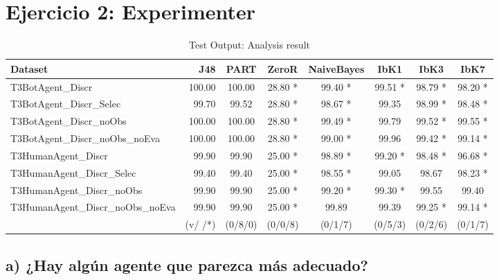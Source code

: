 \documentclass[10pt, spanish, pdftex]{../.memo/plantilla_memorias}
\begin{document}
\section{Ejercicio 2: Experimenter}
\begin{table}[h]
	\centering
	\begin{tabular}{l|r|cccccc|}
	\hline
	\multicolumn{1}{|l|}{Dataset}                           & J48     & PART    & ZeroR   & NaiveBayes & IbK1    & IbK3    & IbK7    \\ \hline
	\multicolumn{1}{|l|}{T3BotAgent\_Discr}                 & 100.00  & 100.00  & 28.80 * & 99.40 *    & 99.51 * & 98.79 * & 98.20 * \\
	\multicolumn{1}{|l|}{T3BotAgent\_Discr\_Selec}          & 99.70   & 99.52   & 28.80 * & 98.67 *    & 99.35   & 98.99 * & 98.48 * \\
	\multicolumn{1}{|l|}{T3BotAgent\_Discr\_noObs}          & 100.00  & 100.00  & 28.80 * & 99.49 *    & 99.79   & 99.52 * & 99.55 * \\
	\multicolumn{1}{|l|}{T3BotAgent\_Discr\_noObs\_noEva}   & 100.00  & 100.00  & 28.80 * & 99.00 *    & 99.96   & 99.42 * & 99.14 * \\
	\multicolumn{1}{|l|}{T3HumanAgent\_Discr}               & 99.90   & 99.90   & 25.00 * & 98.89 *    & 99.20 * & 98.48 * & 96.68 * \\
	\multicolumn{1}{|l|}{T3HumanAgent\_Discr\_Selec}        & 99.40   & 99.40   & 25.00 * & 98.55 *    & 99.05   & 98.67   & 98.23 * \\
	\multicolumn{1}{|l|}{T3HumanAgent\_Discr\_noObs}        & 99.90   & 99.90   & 25.00 * & 99.20 *    & 99.30 * & 99.55   & 99.40   \\
	\multicolumn{1}{|l|}{T3HumanAgent\_Discr\_noObs\_noEva} & 99.90   & 99.90   & 25.00 * & 99.89      & 99.39   & 99.25 * & 99.14 * \\ \hline
	\multicolumn{1}{r|}{}                                   & (v/ /*) & (0/8/0) & (0/0/8) & (0/1/7)    & (0/5/3) & (0/2/6) & (0/1/7) \\ \cline{2-8} 
	\end{tabular}
	\renewcommand{\tablename}{Tabla}
	\caption{\label{tabla1}Test Output: Analysis result}
\end{table}

\subsection{a) ¿Hay algún agente que parezca más adecuado?}
\end{document}
